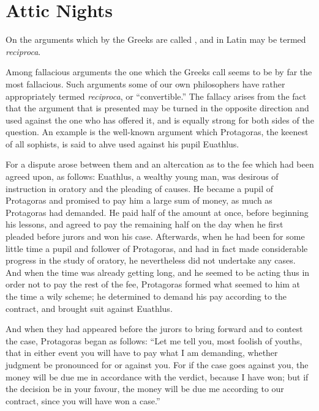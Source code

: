 
\author{Aulus Gellius}
\chapter[Attic Nights, bk. 5.10]{Attic Nights}

\begin{center}{\small On the arguments which by the Greeks
are called , and in Latin may be termed
\textit{reciproca}.}\end{center}

\noindent Among fallacious arguments the one which the Greeks call
 seems to be by far the most fallacious. Such
arguments some of our own philosophers have rather appropriately
termed \textit{reciproca}, or ``convertible.'' The fallacy arises from
the fact that the argument that is presented may be turned in the
opposite direction and used against the one who has offered it, and is
equally strong for both sides of the question. An example is the
well-known argument which Protagoras, the keenest of all sophists, is
said to ahve used against his pupil Euathlus.

 For a dispute arose between them and an altercation as to
the fee which had been agreed upon, as follows: Euathlus, a wealthy
young man, was desirous of instruction in oratory and the pleading of
causes. He became a pupil of Protagoras and promised to pay him a
large sum of money, as much as Protagoras had demanded. He paid half
of the amount at once, before beginning his lessons, and agreed to pay
the remaining half on the day when he first pleaded before jurors and
won his case. Afterwards, when he had been for some little time a
pupil and follower of Protagoras, and had in fact made considerable
progress in the study of oratory, he nevertheless did not undertake
any cases. And when the time was already getting long, and he seemed
to be acting thus in order not to pay the rest of the fee, Protagoras
formed what seemed to him at the time a wily scheme; he determined to
demand his pay according to the contract, and brought suit against
Euathlus.

And when they had appeared before the jurors to bring forward and to
contest the case, Protagoras began as follows: ``Let me tell you, most
foolish of youths, that in either event you will have to pay what I am
demanding, whether judgment be pronounced for or against you. For if
the case goes against you, the money will be due me in accordance with
the verdict, because I have won; but if the decision be in your
favour, the money will be due me according to our contract, since you
will have won a case.''

